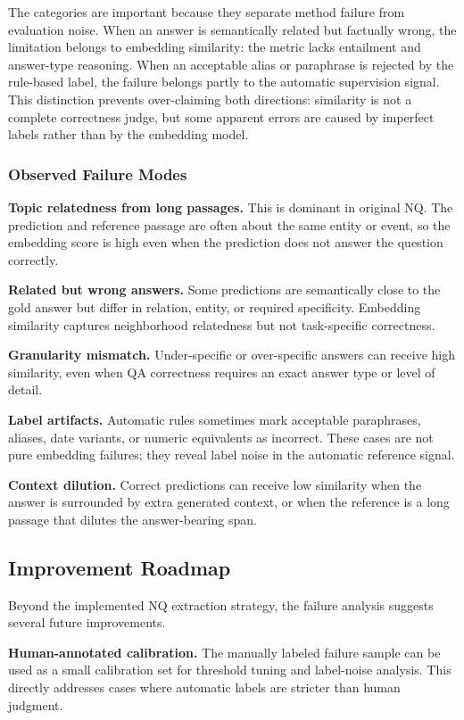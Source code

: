 \documentclass[11pt]{article}
\begin{document}
The categories are important because they separate method failure from evaluation noise. When an answer is semantically related but factually wrong, the limitation belongs to embedding similarity: the metric lacks entailment and answer-type reasoning. When an acceptable alias or paraphrase is rejected by the rule-based label, the failure belongs partly to the automatic supervision signal. This distinction prevents over-claiming both directions: similarity is not a complete correctness judge, but some apparent errors are caused by imperfect labels rather than by the embedding model.

\subsubsection{Observed Failure Modes}

\textbf{Topic relatedness from long passages.}
This is dominant in original NQ. The prediction and reference passage are often about the same entity or event, so the embedding score is high even when the prediction does not answer the question correctly.

\textbf{Related but wrong answers.}
Some predictions are semantically close to the gold answer but differ in relation, entity, or required specificity. Embedding similarity captures neighborhood relatedness but not task-specific correctness.

\textbf{Granularity mismatch.}
Under-specific or over-specific answers can receive high similarity, even when QA correctness requires an exact answer type or level of detail.

\textbf{Label artifacts.}
Automatic rules sometimes mark acceptable paraphrases, aliases, date variants, or numeric equivalents as incorrect. These cases are not pure embedding failures; they reveal label noise in the automatic reference signal.

\textbf{Context dilution.}
Correct predictions can receive low similarity when the answer is surrounded by extra generated context, or when the reference is a long passage that dilutes the answer-bearing span.

\subsection{Improvement Roadmap}

Beyond the implemented NQ extraction strategy, the failure analysis suggests several future improvements.

\textbf{Human-annotated calibration.}
The manually labeled failure sample can be used as a small calibration set for threshold tuning and label-noise analysis. This directly addresses cases where automatic labels are stricter than human judgment.
\end{document}
